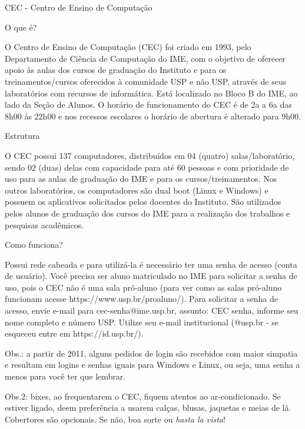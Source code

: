 \begin{secao}{CEC - Centro de Ensino de Computação}

\begin{subsecao}{O que é?}

O Centro de Ensino de Computação (CEC) foi criado em 1993, pelo
Departamento de Ciência de Computação do IME, com o objetivo de
oferecer apoio às aulas dos cursos de graduação do Instituto e para os
treinamentos/cursos oferecidos à comunidade USP e não USP, através de
seus laboratórios com recursos de informática.
Está localizado no Bloco B do IME, ao lado da Seção de Alunos. O horário
de funcionamento do CEC é de 2a a 6a das 8h00 às 22h00 e nos recessos
escolares o horário de abertura é alterado para 9h00.

\end{subsecao}

\begin{subsecao}{Estrutura}

O CEC possui 137 computadores, distribuídos em 04 (quatro)
salas/laboratório, sendo 02 (duas) delas com capacidade para até 60
pessoas e com prioridade de uso para as aulas de graduação do IME e
para os cursos/treinamentos.
Nos outros laboratórios, os computadores são dual boot (Linux e Windows) e
possuem os aplicativos solicitados pelos docentes do Instituto. São
utilizados pelos alunos de graduação dos cursos do IME para a realização
dos trabalhos e pesquisas acadêmicos.

\end{subsecao}

\begin{subsecao}{Como funciona?}

Possui rede cabeada e para utilizá-la é necessário ter uma senha de
acesso (conta de usuário). Você precisa ser aluno matriculado no IME para
solicitar a senha de uso, pois o CEC não é uma sala pró-aluno (para ver
como as salas pró-aluno funcionam acesse https://www.usp.br/proaluno/). 
Para solicitar a senha de acesso, envie e-mail para cec-senha@ime.usp.br,
assunto: CEC senha, informe seu nome completo e número USP. Utilize
seu e-mail institucional (@usp.br - se esqueceu entre em
https://id.usp.br/).

\end{subsecao}

Obs.: a partir de 2011, alguns pedidos de login são recebidos com maior simpatia
e resultam em logins e senhas iguais para Windows e Linux, ou seja, uma senha a
menos para você ter que lembrar.

Obs.2: bixes, ao frequentarem o CEC, fiquem atentos ao ar-condicionado. Se
estiver ligado, deem preferência a usarem calças, blusas, jaquetas e meias de
lã. Cobertores são opcionais. Se não, boa sorte ou \textit{hasta la vista}!

\end{secao}

